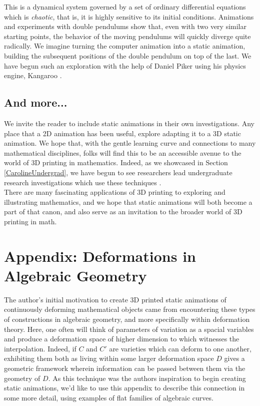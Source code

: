 \documentclass[12 pt]{article}
\begin{document}
This is a dynamical system governed by a set of ordinary differential equations which is \textit{chaotic}, that is, it is highly sensitive to its initial conditions.  Animations and experiments with double pendulums show that, even with two very similar starting points, the behavior of the moving pendulums will quickly diverge quite radically.  We imagine turning the computer animation into a static animation, building the subsequent positions of the double pendulum on top of the last.  We have begun such an exploration with the help of Daniel Piker using his physics engine, Kangaroo \cite{kangaroo}.
\subsection{And more...}
We invite the reader to include static animations in their own investigations.   Any place that a 2D animation has been useful, explore adapting it to a 3D static animation.  We hope that, with the gentle learning curve and connections to many mathematical disciplines, folks will find this to be an accessible avenue to the world of 3D printing in mathematics.  Indeed, as we showcased in Section \ref{CarolineUndergrad}, we have begun to see researchers lead undergraduate research investigations which use these techniques \cite{log(iu)}.\\

There are many fascinating applications of 3D printing to exploring and illustrating mathematics, and we hope that static animations will both become a part of that canon, and also serve as an invitation to the broader world of 3D printing in math.

{}


\appendix
\section*{Appendix: Deformations in Algebraic Geometry}
The author's initial motivation to create 3D printed static animations of continuously deforming mathematical objects came from encountering these types of constructions in algebraic geometry, and more specifically within deformation theory.  Here, one often will think of parameters of variation as a spacial variables and produce a deformation space of higher dimension to which witnesses the interpolation.  Indeed, if $C$ and $C'$ are varieties which can deform to one another, exhibiting them both as living within some larger deformation space $D$ gives a geometric framework wherein information can be passed between them via the geometry of $D$.  As this technique was the authors inspiration to begin creating static animations, we'd like to use this appendix to describe this connection in some more detail, using examples of flat families of algebraic curves.\\
\end{document}
